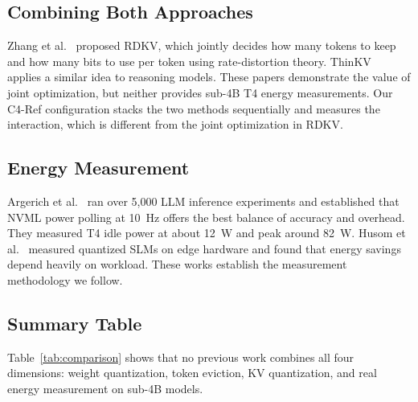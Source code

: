 \documentclass[sigconf,nonacm]{acmart}
\begin{document}
\subsection{Combining Both Approaches}
Zhang et al.~\cite{zhang_rdkv_2026} proposed RDKV, which jointly decides how many
tokens to keep and how many bits to use per token using rate-distortion theory.
ThinKV~\cite{ramachandran_thinkv_2026} applies a similar idea to reasoning models.
These papers demonstrate the value of joint optimization, but neither provides
sub-4B T4 energy measurements. Our C4-Ref configuration stacks the two methods
sequentially and measures the interaction, which is different from the joint
optimization in RDKV.

\subsection{Energy Measurement}
Argerich et al.~\cite{argerich_watt_2026} ran over 5,000 LLM inference experiments
and established that NVML power polling at 10~Hz offers the best balance of
accuracy and overhead. They measured T4 idle power at about 12~W and peak around
82~W. Husom et al.~\cite{husom_sustainable_2025} measured quantized SLMs on edge
hardware and found that energy savings depend heavily on workload. These works
establish the measurement methodology we follow.

\subsection{Summary Table}

Table~\ref{tab:comparison} shows that no previous work combines all four
dimensions: weight quantization, token eviction, KV quantization, and real energy
measurement on sub-4B models.
\end{document}
